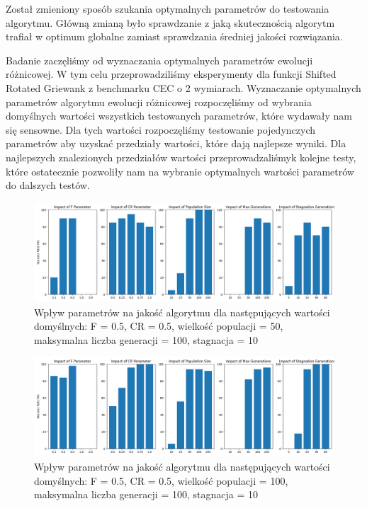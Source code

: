\documentclass{article}
\begin{document}
Został zmieniony sposób szukania optymalnych parametrów do testowania algorytmu. Główną zmianą było sprawdzanie z jaką skutecznością algorytm trafiał w optimum globalne zamiast sprawdzania średniej jakości rozwiązania.


Badanie zaczęliśmy od wyznaczania optymalnych parametrów ewolucji różnicowej. W tym celu przeprowadziliśmy eksperymenty dla funkcji Shifted Rotated Griewank z benchmarku CEC o 2 wymiarach. Wyznaczanie optymalnych parametrów algorytmu ewolucji różnicowej rozpoczęliśmy od wybrania domyślnych wartości wszystkich testowanych parametrów, które wydawały nam się sensowne. Dla tych wartości rozpoczęliśmy testowanie pojedynczych parametrów aby uzyskać przedziały wartości, które dają najlepsze wyniki. Dla najlepszych znalezionych przedziałów wartości przeprowadzaliśmyk kolejne testy, które ostatecznie pozwoliły nam na wybranie optymalnych wartości parametrów do dalszych testów. 

\begin{figure}[H]
    \centering
    \includegraphics[width=\textwidth]{parameter_tuning_results_separate1.png}
    \caption{Wpływ parametrów na jakość algorytmu dla następujących wartości domyślnych: F = 0.5, CR = 0.5, wielkość populacji = 50, maksymalna liczba generacji = 100, stagnacja = 10}
    \label{fig:parameter_results1}
\end{figure}

\begin{figure}[H]
    \centering
    \includegraphics[width=\textwidth]{parameter_tuning_results_separate2.png}
    \caption{Wpływ parametrów na jakość algorytmu dla następujących wartości domyślnych: F = 0.5, CR = 0.5, wielkość populacji = 100, maksymalna liczba generacji = 100, stagnacja = 10}
    \label{fig:parameter_results2}
\end{figure}
\end{document}
